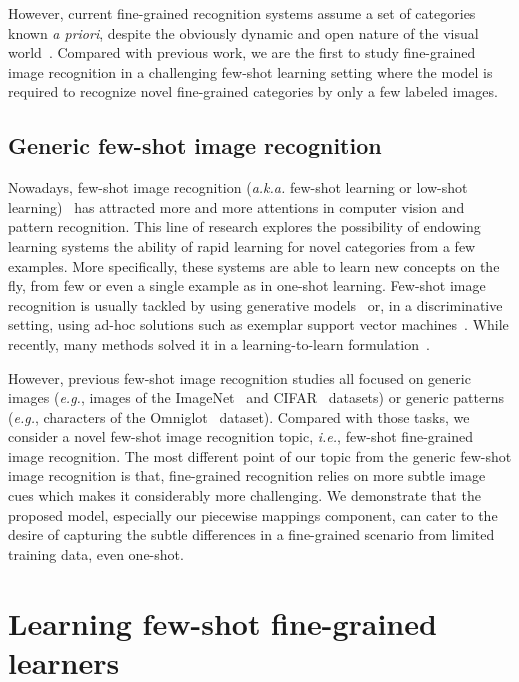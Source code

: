 \documentclass[10pt,twocolumn,letterpaper]{article}
\begin{document}
However, current fine-grained recognition systems assume a set of categories known \emph{a priori}, despite the obviously dynamic and open nature of the visual world~\cite{feedforward16NIPS,Wang16ECCV,L2Lobjdec15CVPR}. Compared with previous work, we are the first to study fine-grained image recognition in a challenging few-shot learning setting where the model is required to recognize novel fine-grained categories by only a few labeled images.

\subsection{Generic few-shot image recognition}

Nowadays, few-shot image recognition (\emph{a.k.a.} few-shot learning or low-shot learning)~\cite{feedforward16NIPS, matchnet16NIPS} has attracted more and more attentions in computer vision and pattern recognition. This line of research explores the possibility of endowing learning systems the ability of rapid learning for novel categories from a few examples. More specifically, these systems are able to learn new concepts on the fly, from few or even a single example as in one-shot learning. Few-shot image recognition is usually tackled by using generative models~\cite{science,rezende16ICML} or, in a discriminative setting, using ad-hoc solutions such as exemplar support vector machines~\cite{exemplarSVM11ICCV}. While recently, many methods solved it in a learning-to-learn formulation~\cite{modelago17ICML, unsupervised16NIPS, L2Lobjdec15CVPR, Wang16ECCV, Serena17CVPR}.

However, previous few-shot image recognition studies all focused on generic images (\emph{e.g.}, images of the ImageNet~\cite{ILSVRC15} and CIFAR~\cite{cifar} datasets) or generic patterns (\emph{e.g.}, characters of the Omniglot~\cite{cogsci2011} dataset). Compared with those tasks, we consider a novel few-shot image recognition topic, \emph{i.e.}, few-shot fine-grained image recognition. The most different point of our topic from the generic few-shot image recognition is that, fine-grained recognition relies on more subtle image cues which makes it considerably more challenging. We demonstrate that the proposed model, especially our piecewise mappings component, can cater to the desire of capturing the subtle differences in a fine-grained scenario from limited training data, even one-shot.

\section{Learning few-shot fine-grained learners}\label{sec:model}
\end{document}
